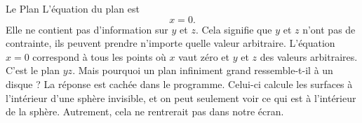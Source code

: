 \begin{surferPage}[Plan]{Le Plan}
L'équation du plan est \[x=0.\] Elle ne contient pas d'information sur $y$ et $z$. Cela signifie que $y$ et $z$ n'ont pas de contrainte, ils peuvent prendre n'importe quelle valeur arbitraire.
L'équation $x=0$ correspond à tous les points où $x$ vaut zéro et $y$ et $z$ des valeurs arbitraires. C'est le plan $yz$.
\newline \newline
Mais pourquoi un plan infiniment grand ressemble-t-il à un disque ? La réponse est cachée dans le programme. Celui-ci calcule les surfaces à l'intérieur d'une sphère invisible, et on peut seulement voir ce qui est à l'intérieur de la sphère. Autrement, cela ne rentrerait pas dans notre écran.
\end{surferPage}